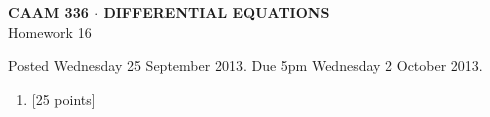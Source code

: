\documentclass[10pt]{article}
\begin{document}
\vspace*{-5em}
\begin{center}
\large \textsf{\textbf{CAAM 336 $\cdot$ DIFFERENTIAL EQUATIONS}\\[0.5em]
Homework 16 }
\end{center}

Posted Wednesday 25 September 2013.  Due 5pm Wednesday 2 October 2013.

\begin{enumerate}\addtocounter{enumi}{15}
\item {[25 points]}  
\end{enumerate}
\end{document}
